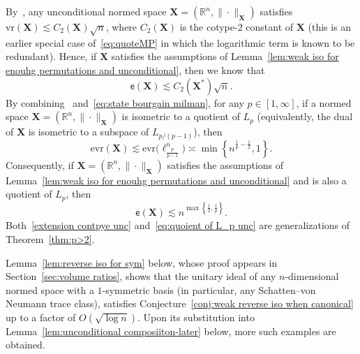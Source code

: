 \documentclass[11pt,reqno]{amsart}
\newcommand{\vr}{\mathrm{vr}}
\newcommand{\evr}{\mathrm{evr}}
\newcommand{\X}{\mathbf X}
\newcommand{\R}{\mathbb R}
\theoremstyle{remark}
\newcommand{\ee}{\mathsf{e}}
\renewcommand{\1}{\mathbf 1}
\begin{document}
By~\cite[Theorem~2.1]{ST-J80}, any unconditional normed space $\X=(\R^n,\|\cdot\|_\X)$ satisfies $\vr(\X)\lesssim C_2(\X)\sqrt{n}$, where $C_2(\X)$ is the cotype-$2$ constant of $\X$ (this is an earlier special case of~\eqref{eq:quoteMP} in which the logarithmic term is known to be redundant). Hence, if $\X$ satisfies the assumptions of Lemma~\ref{lem:weak iso for enouhg permutations and unconditional}, then we know that
\begin{equation}\label{extension contpye unc}
\ee(\X)\lesssim C_2(\X^*)\sqrt{n}.
\end{equation}
By combining~\cite[Theorem~6]{Bal91-reverse} and~\eqref{eq:state bourgain milman}, for any $p\in [1,\infty]$, if a normed space $\X=(\R^n,\|\cdot\|_\X)$ is isometric to  a quotient of $L_p$ (equivalently, the dual of $\X$ is isometric to a subspace of $L_{p/(p-1)}$), then $$\evr(\X)\lesssim \evr\Big(\ell_{\!\!\frac{p}{p-1}}^n\Big)\asymp \min\left\{n^{\frac{1}{p}-\frac12},1\right\}.$$
Consequently, if $\X=(\R^n,\|\cdot\|_\X)$ satisfies the assumptions of Lemma~\ref{lem:weak iso for enouhg permutations and unconditional} and is also a quotient of $L_p$, then
\begin{equation}\label{eq:quoient of L_p unc}
\ee(\X)\lesssim n^{\max\left\{\frac12,\frac{1}{p}\right\}}.
\end{equation}
Both~\eqref{extension contpye unc} and~\eqref{eq:quoient of L_p unc}  are generalizations of Theorem~\ref{thm:p>2}.








Lemma~\ref{lem:reverse iso for sym} below, whose proof appears  in Section~\ref{sec:volume ratios}, shows that the unitary ideal of any $n$-dimensional normed space with a $1$-symmetric basis (in particular, any Schatten--von Neumann trace class), satisfies  Conjecture~\ref{conj:weak reverse iso when canonical} up to a factor of $O(\sqrt{\log n})$. Upon its substitution into  Lemma~\ref{lem:unconditional composiiton-later} below, more such examples are obtained.
\end{document}
